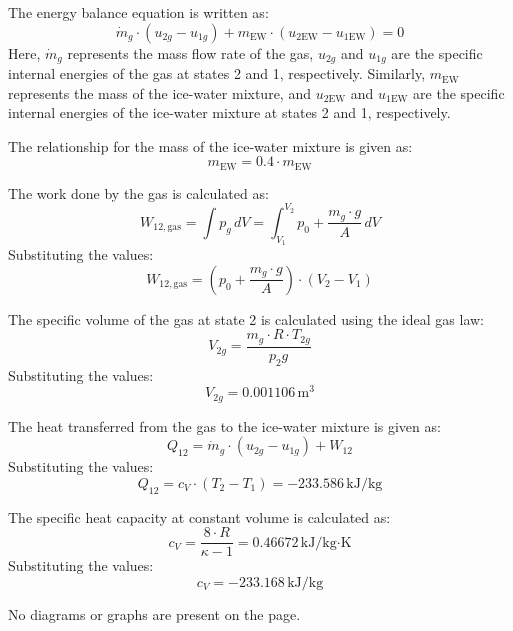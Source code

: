 The energy balance equation is written as:  
\[
\dot{m}_g \cdot (u_{2g} - u_{1g}) + m_{\text{EW}} \cdot (u_{2\text{EW}} - u_{1\text{EW}}) = 0
\]  
Here, \( \dot{m}_g \) represents the mass flow rate of the gas, \( u_{2g} \) and \( u_{1g} \) are the specific internal energies of the gas at states 2 and 1, respectively. Similarly, \( m_{\text{EW}} \) represents the mass of the ice-water mixture, and \( u_{2\text{EW}} \) and \( u_{1\text{EW}} \) are the specific internal energies of the ice-water mixture at states 2 and 1, respectively.

The relationship for the mass of the ice-water mixture is given as:  
\[
m_{\text{EW}} = 0.4 \cdot m_{\text{EW}}
\]  

The work done by the gas is calculated as:  
\[
W_{12,\text{gas}} = \int p_g \, dV = \int_{V_1}^{V_2} p_0 + \frac{m_g \cdot g}{A} \, dV
\]  
Substituting the values:  
\[
W_{12,\text{gas}} = (p_0 + \frac{m_g \cdot g}{A}) \cdot (V_2 - V_1)
\]  

The specific volume of the gas at state 2 is calculated using the ideal gas law:  
\[
V_{2g} = \frac{m_g \cdot R \cdot T_{2g}}{p_2g}
\]  
Substituting the values:  
\[
V_{2g} = 0.001106 \, \text{m}^3
\]  

The heat transferred from the gas to the ice-water mixture is given as:  
\[
Q_{12} = \dot{m}_g \cdot (u_{2g} - u_{1g}) + W_{12}
\]  
Substituting the values:  
\[
Q_{12} = c_V \cdot (T_2 - T_1) = -233.586 \, \text{kJ/kg}
\]  

The specific heat capacity at constant volume is calculated as:  
\[
c_V = \frac{8 \cdot R}{\kappa - 1} = 0.46672 \, \text{kJ/kg·K}
\]  
Substituting the values:  
\[
c_V = -233.168 \, \text{kJ/kg}
\]  

No diagrams or graphs are present on the page.